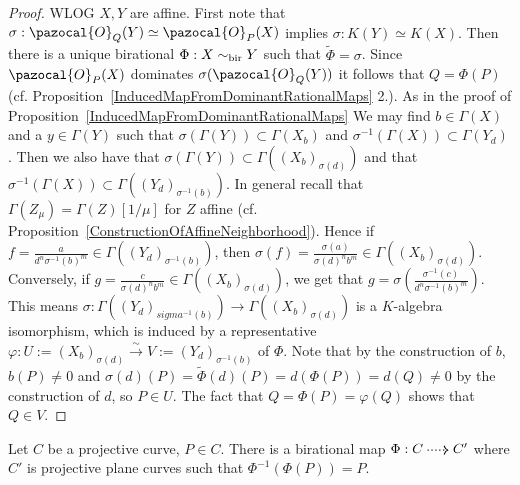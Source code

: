     \begin{proof}
        WLOG $X,Y$ are affine. First note that $\sigma:\pazocal{O}_Q(Y)\simeq \pazocal{O}_P(X)$ implies $\sigma: K(Y)\simeq K(X)$. Then there is a unique birational $\Phi : X\sim_{\mathrm{bir}} Y$ such that $\widetilde{\Phi}=\sigma$. Since $\pazocal{O}_P(X)$ dominates $\sigma(\pazocal{O}_Q(Y))$ it follows that $Q=\Phi(P)$ (cf. Proposition~\ref{InducedMapFromDominantRationalMaps} 2.). As in the proof of Proposition~\ref{InducedMapFromDominantRationalMaps} We may find $b\in \Gamma(X)$ and a $y\in \Gamma(Y)$ such that $\sigma(\Gamma(Y))\subset \Gamma(X_b)$ and $\sigma^{-1}(\Gamma(X))\subset \Gamma(Y_d)$. Then we also have that $\sigma(\Gamma(Y))\subset \Gamma((X_b)_{\sigma(d)})$ and that $\sigma^{-1}(\Gamma(X))\subset \Gamma((Y_d)_{\sigma^{-1}(b)})$. In general recall that $\Gamma(Z_\mu)=\Gamma(Z)[1/\mu]$ for $Z$ affine (cf. Proposition~\ref{ConstructionOfAffineNeighborhood}). Hence if $f=\frac{a}{d^n\sigma^{-1}(b)^m}\in \Gamma((Y_d)_{\sigma^{-1}(b)})$, then $\sigma(f)=\frac{\sigma(a)}{\sigma(d)^nb^m}\in \Gamma((X_b)_{\sigma(d)})$. Conversely, if $g=\frac{c}{\sigma(d)^nb^m}\in \Gamma((X_b)_{\sigma(d)})$, we get that $g=\sigma\left(\frac{\sigma^{-1}(c)}{d^n\sigma^{-1}(b)^m}\right).$ This means $\sigma : \Gamma((Y_d)_{sigma^{-1}(b)})\rightarrow \Gamma((X_b)_{\sigma(d)})$ is a $K$-algebra isomorphism, which is induced by a representative $\varphi: U:=(X_b)_{\sigma(d)}\overset{\sim}{\rightarrow} V:=(Y_d)_{\sigma^{-1}(b)}$ of $\Phi$. Note that by the construction of $b$, $b(P)\neq 0$ and $\sigma(d)(P)= \widetilde{\Phi}(d)(P)=d(\Phi(P))=d(Q)\neq 0$ by the construction of $d$, so $P\in U$. The fact that $Q=\Phi(P)=\varphi(Q)$ shows that $Q\in V$. 
    \end{proof}
    \begin{proposition}
        Let $C$ be a projective curve, $P\in C$. There is a birational map $\Phi: C \dottedarrow C'$ where $C'$ is projective plane curves such that $\Phi^{-1}(\Phi(P))=P$. 
    \end{proposition}
